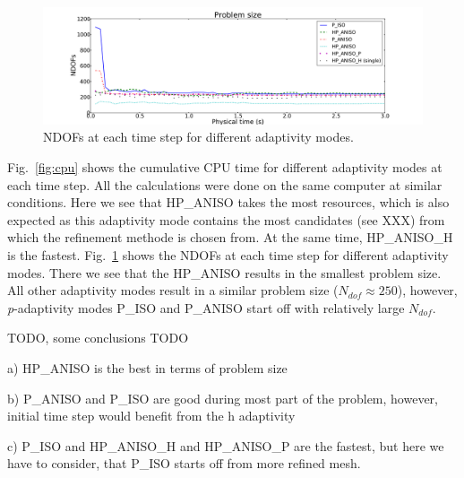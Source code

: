 \begin{figure}
  \begin{centering}
  \includegraphics[width=\columnwidth]{dof}
  \caption{\label{fig:dof} NDOFs at each time step for different adaptivity modes.}
  \end{centering}
\end{figure}

Fig.~\ref{fig:cpu} shows the cumulative CPU time for different adaptivity
modes at each time step. All the calculations were done on the same computer
at similar conditions. Here we see that HP\_ANISO takes the most
resources, which is also expected as this adaptivity mode contains the most
candidates (see XXX) from which the refinement methode is chosen from.
At the same time, HP\_ANISO\_H is the fastest.
Fig.~\ref{fig:dof} shows the NDOFs at each time step for different adaptivity modes.
There we see that the HP\_ANISO results in the smallest problem size. All other
adaptivity modes result in a similar problem size ($N_{dof} \approx 250$), however,
\emph{p}-adaptivity modes P\_ISO and P\_ANISO start off with relatively large $N_{dof}$.



TODO, some conclusions TODO

a) HP\_ANISO is the best in terms of problem size

b) P\_ANISO and P\_ISO are good during most part of the problem, however,
initial time step would benefit from the h adaptivity

c) P\_ISO and HP\_ANISO\_H and HP\_ANISO\_P are the fastest, but here
we have to consider, that P\_ISO starts off from more refined mesh.

